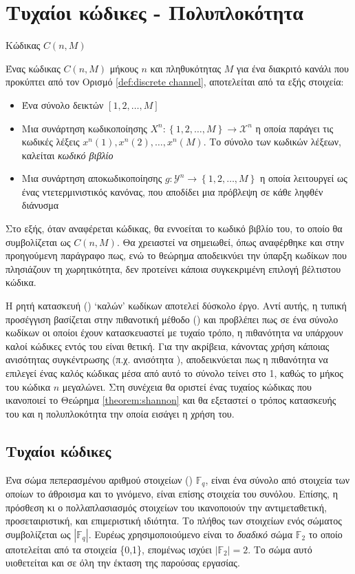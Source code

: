 \section{Τυχαίοι κώδικες - Πολυπλοκότητα}
\begin{definition}{Κώδικας $C(n,M)$}

Ένας κώδικας $C(n,M)$ μήκους $n$ και πληθυκότητας $M$ για ένα διακριτό κανάλι που προκύπτει από τον Ορισμό \ref{def:discrete channel}, αποτελείται από τα εξής στοιχεία:
\begin{itemize}
\item Ένα σύνολο δεικτών $[1, 2, \ldots, M]$ 
\item Μια συνάρτηση κωδικοποίησης $X^n:\left\lbrace1, 2, \ldots, M\right\rbrace\to\mathcal{X}^n$ η οποία παράγει τις κωδικές λέξεις $x^n\left(1\right), x^n\left(2\right), \ldots, x^n\left(M\right)$. Το σύνολο των κωδικών λέξεων, καλείται \textit{κωδικό βιβλίο}
\item Μια συνάρτηση αποκωδικοποίησης $g:\mathcal{Y}^n\to\left\lbrace1, 2, \ldots, M\right\rbrace$ η οποία λειτουργεί ως ένας ντετερμινιστικός κανόνας, που αποδίδει μια πρόβλεψη σε κάθε ληφθέν διάνυσμα
\end{itemize}
\label{def:code}
\end{definition}

Στο εξής, όταν αναφέρεται κώδικας, θα εννοείται το κωδικό βιβλίο του, το οποίο θα συμβολίζεται ως $C(n,M)$. Θα χρειαστεί να σημειωθεί, όπως αναφέρθηκε και στην προηγούμενη παράγραφο πως, ενώ το θεώρημα  αποδεικνύει την ύπαρξη κωδίκων που πλησιάζουν τη χωρητικότητα, δεν προτείνει κάποια συγκεκριμένη επιλογή βέλτιστου κώδικα.

Η ρητή κατασκευή () \enquote*{καλών} κωδίκων αποτελεί δύσκολο έργο. Αντί αυτής, η τυπική προσέγγιση βασίζεται στην πιθανοτική μέθοδο () και προβλέπει πως σε ένα σύνολο κωδίκων οι οποίοι έχουν κατασκευαστεί με τυχαίο τρόπο, η πιθανότητα να υπάρχουν καλοί κώδικες εντός του είναι θετική. Για την ακρίβεια, κάνοντας χρήση κάποιας ανισότητας συγκέντρωσης (π.χ. ανισότητα ), αποδεικνύεται πως η πιθανότητα να επιλεγεί ένας καλός κώδικας μέσα από αυτό το σύνολο τείνει στο 1, καθώς το μήκος του κώδικα $n$ μεγαλώνει. Στη συνέχεια θα οριστεί ένας τυχαίος κώδικας που ικανοποιεί το Θεώρημα \ref{theorem:shannon} και θα εξεταστεί ο τρόπος κατασκευής του και η πολυπλοκότητα την οποία εισάγει η χρήση του.

\subsection{Τυχαίοι κώδικες}
Ένα σώμα πεπερασμένου αριθμού στοιχείων () $\mathbb{F}_q$, είναι ένα σύνολο από στοιχεία των οποίων το άθροισμα και το γινόμενο, είναι επίσης στοιχεία του συνόλου. Επίσης, η πρόσθεση κι ο πολλαπλασιασμός στοιχείων του ικανοποιούν την αντιμεταθετική, προσεταιριστική, και επιμεριστική ιδιότητα. Tο πλήθος των στοιχείων ενός σώματος συμβολίζεται ως $|\mathbb{F}_q|$. Ευρέως χρησιμοποιούμενο είναι το \textit{δυαδικό} σώμα $\mathbb{F}_2$ το οποίο αποτελείται από τα στοιχεία \{0,1\}, επομένως ισχύει $|\mathbb{F}_2|=2$. Το σώμα αυτό υιοθετείται και σε όλη την έκταση της παρούσας εργασίας.


